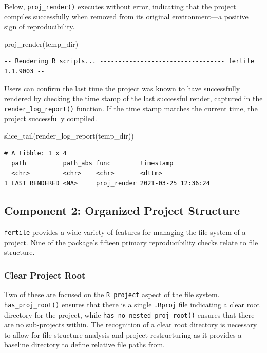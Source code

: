 \documentclass[12pt,twoside]{reedthesis}
\newenvironment{Shaded}{\begin{snugshade}}{\end{snugshade}}
\newcommand{\FunctionTok}[1]{\textcolor[rgb]{0.00,0.00,0.00}{#1}}
\newcommand{\NormalTok}[1]{#1}
\begin{document}
Below, \texttt{proj\_render()} executes without error, indicating that the project compiles successfully when removed from its original environment---a positive sign of reproducibility.
\begin{Shaded}
\begin{Highlighting}[]
\FunctionTok{proj\_render}\NormalTok{(temp\_dir)}
\end{Highlighting}
\end{Shaded}
\begin{verbatim}
-- Rendering R scripts... ---------------------------------- fertile 1.1.9003 --
\end{verbatim}
Users can confirm the last time the project was known to have successfully rendered by checking the time stamp of the last successful render, captured in the \texttt{render\_log\_report()} function. If the time stamp matches the current time, the project successfully compiled.
\begin{Shaded}
\begin{Highlighting}[]
\FunctionTok{slice\_tail}\NormalTok{(}\FunctionTok{render\_log\_report}\NormalTok{(temp\_dir))}
\end{Highlighting}
\end{Shaded}
\begin{verbatim}
# A tibble: 1 x 4
  path          path_abs func        timestamp          
  <chr>         <chr>    <chr>       <dttm>             
1 LAST RENDERED <NA>     proj_render 2021-03-25 12:36:24
\end{verbatim}
\hypertarget{component-2-organized-project-structure}{%
\subsection{Component 2: Organized Project Structure}\label{component-2-organized-project-structure}}

\texttt{fertile} provides a wide variety of features for managing the file system of a project. Nine of the package's fifteen primary reproducibility checks relate to file structure.

\hypertarget{clear-project-root}{%
\subsubsection{Clear Project Root}\label{clear-project-root}}

Two of these are focused on the \texttt{R\ project} aspect of the file system. \texttt{has\_proj\_root()} ensures that there is a single \texttt{.Rproj} file indicating a clear root directory for the project, while \texttt{has\_no\_nested\_proj\_root()} ensures that there are no sub-projects within. The recognition of a clear root directory is necessary to allow for file structure analysis and project restructuring as it provides a baseline directory to define relative file paths from.
\end{document}
